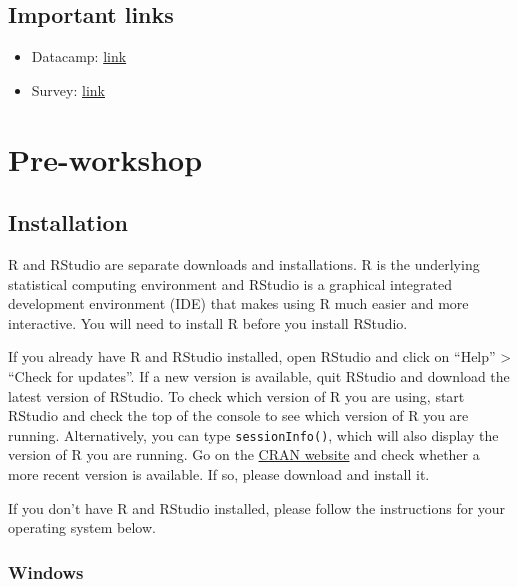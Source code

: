 \documentclass[]{book}
\providecommand{\tightlist}{%
  \setlength{\itemsep}{0pt}\setlength{\parskip}{0pt}}
\begin{document}
\hypertarget{important-links}{%
\section{Important links}\label{important-links}}

\begin{itemize}
\tightlist
\item
  Datacamp: \href{https://www.datacamp.com/home}{link}
\end{itemize}

\begin{itemize}
\tightlist
\item
  Survey: \href{https://forms.gle/nQvZon6DBM6c38Np9}{link}
\end{itemize}

\hypertarget{pre-workshop}{%
\chapter{Pre-workshop}\label{pre-workshop}}

\hypertarget{installation}{%
\section{Installation}\label{installation}}

R and RStudio are separate downloads and installations. R is the underlying statistical computing environment and RStudio is a graphical integrated development environment (IDE) that makes using R much easier and more interactive. You will need to install R before you install RStudio.

 If you already have R and RStudio installed, open RStudio and click on ``Help'' \textgreater{} ``Check for updates''. If a new version is available, quit RStudio and download the latest version of RStudio. To check which version of R you are using, start RStudio and check the top of the console to see which version of R you are running. Alternatively, you can type \texttt{sessionInfo()}, which will also display the version of R you are running. Go on the \href{https://cran.r-project.org/bin/windows/base/}{CRAN website} and check whether a more recent version is available. If so, please download and install it.

 If you don't have R and RStudio installed, please follow the instructions for your operating system below.

\hypertarget{windows}{%
\subsection{Windows}\label{windows}}
\end{document}
